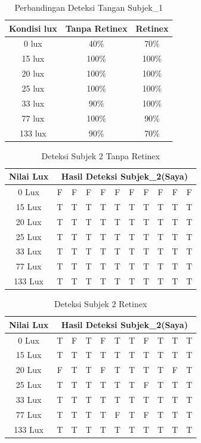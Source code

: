 \begin{table}[H]
	\caption{Perbandingan Deteksi Tangan Subjek\_1}
	\vspace{0cm}
	\centering
	\begin{tabular}{|c|c|c|}
		\hline Kondisi lux &  Tanpa Retinex &Retinex \\
		\hline  0 lux &40\% &70\% \\
		\hline 15 lux &100\% &100\% \\
		\hline 20 lux &100\% &100\% \\
		\hline 25 lux &100\% &100\% \\
		\hline 33 lux &90\% &100\% \\
		\hline 77 lux &100\% &90\% \\
		\hline 133 lux& 90\% & 70\% \\
		\hline
	\end{tabular}
\end{table}
\begin{table}[H]
	\centering
	\caption{Deteksi Subjek 2 Tanpa Retinex}
	\begin{tabular}{|c|c|c|c|c|c|c|c|c|c|c|}
		\hline Nilai Lux
		& \multicolumn{10}{|c|}{Hasil Deteksi Subjek\_2(Saya)} \\
		\hline 0 Lux &F&F&F&F&F&F&F&F&F&F\\
		\hline 15 Lux &T&T&T&T&T&T&T&T&T&T\\
		\hline 20 Lux &T&T&T&T&T&T&T&T&T&T\\
		\hline 25 Lux &T&T&T&T&T&T&T&T&T&T \\
		\hline 33 Lux &T&T&T&T&T&T&T&T&T&T \\
		\hline 77 Lux &T&T&T&T&T&T&T&T&T&T\\
		\hline 133 Lux &T&T&T&T&T&T&T&T&T&T\\
		\hline
	\end{tabular}
\end{table}
\begin{table}[H]
	\centering
	\caption{Deteksi Subjek 2 Retinex}
	\begin{tabular}{|c|c|c|c|c|c|c|c|c|c|c|}
		\hline Nilai Lux
		& \multicolumn{10}{|c|}{Hasil Deteksi Subjek\_2(Saya)} \\
		\hline 0 Lux &T&F&T&F&T&T&F&T&T&T \\
		\hline 15 Lux &T&T&T&T&T&T&T&T&T&T\\
		\hline 20 Lux &F&T&T&F&T&T&T&T&F&T\\
		\hline 25 Lux &T&T&T&T&T&T&F&T&T&T \\
		\hline 33 Lux &T&T&T&T&T&T&T&T&T&T \\
		\hline 77 Lux &T&T&T&T&F&T&F&T&T&T\\
		\hline 133 Lux &T&T&T&T&T&T&T&T&T&T\\
		\hline
	\end{tabular}
\end{table}
